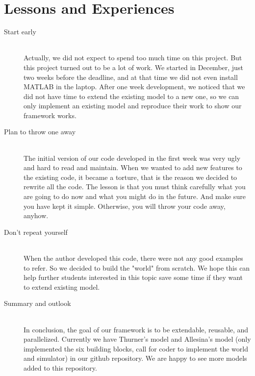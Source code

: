 \documentclass[11pt]{article}
\begin{document}
\section{Lessons and Experiences}
\begin{description}
\item[Start early] \hfill \\
Actually, we did not expect to spend too much time on this project. But this project turned out to be a lot of work. We started in December, just two weeks before the deadline, and at that time we did not even install MATLAB in the laptop. After one week development, we noticed that we did not have time to extend the existing model to a new one, so we can only implement an existing model and reproduce their work to show our framework works.

\item[Plan to throw one away] \hfill \\
The initial version of our code developed in the first week was very ugly and hard to read and maintain. When we wanted to add new features to the existing code, it became a torture, that is the reason we decided to rewrite all the code. The lesson is that you must think carefully what you are going to do now and what you might do in the future. And make sure you have kept it simple. Otherwise, you will throw your code away, anyhow.

\item[Don't repeat yourself] \hfill \\
When the author developed this code, there were not any good examples to refer. So we decided to build the "world" from scratch. We hope this can help further students interested in this topic save some time if they want to extend existing model.

\item[Summary and outlook] \hfill \\
In conclusion, the goal of our framework is to be extendable, reusable, and parallelized. Currently we have Thurner's model and Allesina's model \cite{allesina2009} (only implemented the six building blocks, call for coder to implement the world and simulator) in our github repository. We are happy to see more models added to this repository.

\end{description}

\renewcommand{\refname}{\section{References}}


\end{document}
